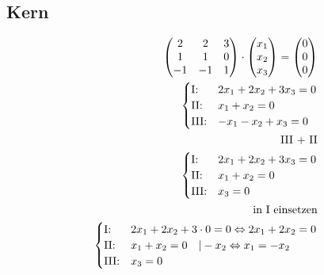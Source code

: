 \subsection*{Kern}
\begin{align*}
    \begin{pmatrix}
        2 & 2 & 3 \\ 1 & 1 & 0 \\ -1 & -1 & 1
    \end{pmatrix} \cdot \begin{pmatrix}
                            x_1 \\ x_2 \\ x_3
                        \end{pmatrix} = \begin{pmatrix}
                                            0 \\ 0 \\ 0
                                        \end{pmatrix}                          \\\pagebreak[0]
    \begin{cases}
        \text{I:\@}   & 2x_1 + 2x_2 + 3x_3 = 0 \\
        \text{II:\@}  & x_1 + x_2 = 0          \\
        \text{III:\@} & -x_1 - x_2 + x_3 = 0
    \end{cases}                                      \\\pagebreak[0]
    \text{III + II}                                                             \\\pagebreak[0]
    \begin{cases}
        \text{I:\@}   & 2x_1 + 2x_2 + 3x_3 = 0 \\
        \text{II:\@}  & x_1 + x_2 = 0          \\
        \text{III:\@} & x_3 = 0
    \end{cases}                                      \\
    \text{in I einsetzen}                                                       \\\pagebreak[0]
    \begin{cases}
        \text{I:\@}   & 2x_1 + 2x_2 + 3 \cdot 0 = 0 \Leftrightarrow 2x_1 + 2x_2 = 0 \\
        \text{II:\@}  & x_1 + x_2 = 0 \quad | -x_2 \Leftrightarrow x_1 = -x_2       \\
        \text{III:\@} & x_3 = 0
    \end{cases} \\\pagebreak[0]

\end{align*}

